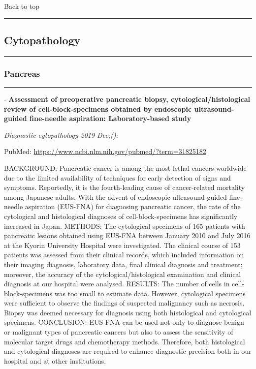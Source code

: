 \documentclass[
]{article}
\renewcommand{\linethickness}{0.05em}
\begin{document}
Back to top

\begin{center}\rule{0.5\linewidth}{\linethickness}\end{center}

\pagebreak

\hypertarget{cytopathology}{%
\subsection{Cytopathology}\label{cytopathology}}

\begin{center}\rule{0.5\linewidth}{\linethickness}\end{center}

\hypertarget{pancreas_cytopathology}{%
\subsubsection{Pancreas}\label{pancreas_cytopathology}}

\begin{center}\rule{0.5\linewidth}{\linethickness}\end{center}

- \textbf{Assessment of preoperative pancreatic biopsy,
cytological/histological review of cell-block-specimens obtained by
endoscopic ultrasound-guided fine-needle aspiration: Laboratory-based
study}

\emph{Diagnostic cytopathology 2019 Dec;():}

PubMed: \url{https://www.ncbi.nlm.nih.gov/pubmed/?term=31825182}

BACKGROUND: Pancreatic cancer is among the most lethal cancers worldwide
due to the limited availability of techniques for early detection of
signs and symptoms. Reportedly, it is the fourth-leading cause of
cancer-related mortality among Japanese adults. With the advent of
endoscopic ultrasound-guided fine-needle aspiration (EUS-FNA) for
diagnosing pancreatic cancer, the rate of the cytological and
histological diagnoses of cell-block-specimens has significantly
increased in Japan. METHODS: The cytological specimens of 165 patients
with pancreatic lesions obtained using EUS-FNA between January 2010 and
July 2016 at the Kyorin University Hospital were investigated. The
clinical course of 153 patients was assessed from their clinical
records, which included information on their imaging diagnosis,
laboratory data, final clinical diagnosis and treatment; moreover, the
accuracy of the cytological/histological examination and clinical
diagnosis at our hospital were analysed. RESULTS: The number of cells in
cell-block-specimens was too small to estimate data. However,
cytological specimens were sufficient to observe the findings of
suspected malignancy such as necrosis. Biopsy was deemed necessary for
diagnosis using both histological and cytological specimens. CONCLUSION:
EUS-FNA can be used not only to diagnose benign or malignant types of
pancreatic cancers but also to assess the sensitivity of molecular
target drugs and chemotherapy methods. Therefore, both histological and
cytological diagnoses are required to enhance diagnostic precision both
in our hospital and at other institutions.
\end{document}
